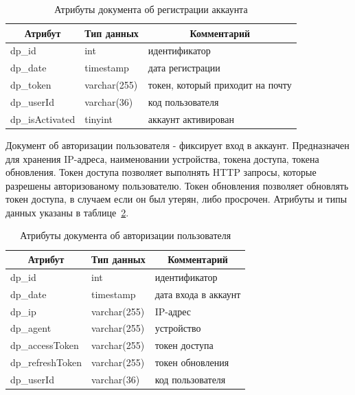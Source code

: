 \begin{table}[!htb]
    \centering\small

    \caption{Атрибуты документа об регистрации аккаунта}
    \label{tab:DP_DOC_ActivatedAccount}
    
    \begin{tabular}{|p{5cm}|p{2.5cm}|p{9cm}|}
        \hline
        \multicolumn{1}{|c|}{Атрибут}
        & \multicolumn{1}{c|}{Тип данных}
        & \multicolumn{1}{c|}{Комментарий}
        \\ \hline

        dp\_id & int & идентификатор \\ \hline
        dp\_date & timestamp & дата регистрации \\ \hline
        dp\_token & varchar(255) & токен, который приходит на почту \\ \hline
        dp\_userId & varchar(36) & код пользователя \\ \hline
        dp\_isActivated & tinyint & аккаунт активирован \\ \hline
    \end{tabular}
\end{table}

Документ об авторизации пользователя - фиксирует вход в аккаунт.
Предназначен для хранения IP-адреса, наименовании устройства, токена доступа, токена обновления.
Токен доступа позволяет выполнять HTTP запросы, которые разрешены авторизованому пользователю.
Токен обновления позволяет обновлять токен доступа, в случаем если он был утерян, либо просрочен.
Атрибуты и типы данных указаны в таблице~\ref{tab:DP_DOC_Sessions}.

\begin{table}[!htb]
    \centering\small

    \caption{Атрибуты документа об авторизации пользователя}
    \label{tab:DP_DOC_Sessions}

    \begin{tabular}{|p{5cm}|p{2.5cm}|p{9cm}|}
        \hline
        \multicolumn{1}{|c|}{Атрибут}
        & \multicolumn{1}{c|}{Тип данных}
        & \multicolumn{1}{c|}{Комментарий}
        \\ \hline

        dp\_id & int & идентификатор \\ \hline
        dp\_date & timestamp & дата входа в аккаунт \\ \hline
        dp\_ip & varchar(255) & IP-адрес \\ \hline
        dp\_agent & varchar(255) & устройство \\ \hline
        dp\_accessToken & varchar(255) & токен доступа \\ \hline
        dp\_refreshToken & varchar(255) & токен обновления \\ \hline
        dp\_userId & varchar(36) & код пользователя \\ \hline
    \end{tabular}
\end{table}

